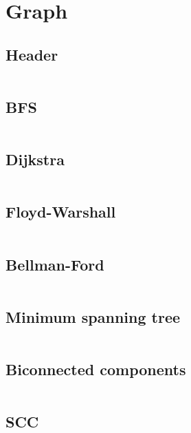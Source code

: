 \section{Graph}
\subsection{Header}
\inputminted[frame=single,framesep=3pt,breaklines=true,tabsize=2,linenos]{c++}{graph/graph.h}

\subsection{BFS}
\inputminted[frame=single,framesep=3pt,breaklines=true,tabsize=2,linenos,label=O(E+V)]{c++}{graph/bfs.cpp}

\subsection{Dijkstra}
\inputminted[frame=single,framesep=3pt,breaklines=true,tabsize=2,linenos,label=O((E+V)log(V))]{c++}{graph/dijkstra.cpp}

\subsection{Floyd-Warshall}
\inputminted[frame=single,framesep=3pt,breaklines=true,tabsize=2,linenos,label=O($V^3$)]{c++}{graph/floyd-warshall.cpp}

\subsection{Bellman-Ford}
\inputminted[frame=single,framesep=3pt,breaklines=true,tabsize=2,linenos,label=O(E V)]{c++}{graph/bellman-ford.cpp}

\subsection{Minimum spanning tree}
\inputminted[frame=single,framesep=3pt,breaklines=true,tabsize=2,linenos,label=O(E log(V))]{c++}{graph/kruskal.cpp}

\subsection{Biconnected components}
\inputminted[frame=single,framesep=3pt,breaklines=true,tabsize=2,linenos,label=O(E+V)]{c++}{graph/biconnected-components.cpp}

\subsection{SCC}
\inputminted[frame=single,framesep=3pt,breaklines=true,tabsize=2,linenos,label=O(E+V)]{c++}{graph/scc.cpp}

